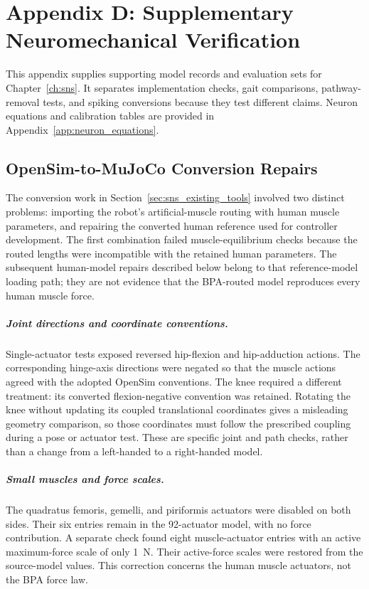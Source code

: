 \chapter{Appendix D: Supplementary Neuromechanical Verification}\label{app:simulation_verification}
\graphicspath{{figs/60-sns/}{figs/60-sns/AnimatLab_reference/}}

This appendix supplies supporting model records and evaluation sets for Chapter~\ref{ch:sns}. It separates implementation checks, gait comparisons, pathway-removal tests, and spiking conversions because they test different claims. Neuron equations and calibration tables are provided in Appendix~\ref{app:neuron_equations}.

\section{OpenSim-to-MuJoCo Conversion Repairs}\label{sec:app_conversion_repairs}

The conversion work in Section~\ref{sec:sns_existing_tools} involved two distinct problems: importing the robot's artificial-muscle routing with human muscle parameters, and repairing the converted human reference used for controller development. The first combination failed muscle-equilibrium checks because the routed lengths were incompatible with the retained human parameters. The subsequent human-model repairs described below belong to that reference-model loading path; they are not evidence that the BPA-routed model reproduces every human muscle force.

\paragraph{Joint directions and coordinate conventions.}
Single-actuator tests exposed reversed hip-flexion and hip-adduction actions. The corresponding hinge-axis directions were negated so that the muscle actions agreed with the adopted OpenSim conventions. The knee required a different treatment: its converted flexion-negative convention was retained. Rotating the knee without updating its coupled translational coordinates gives a misleading geometry comparison, so those coordinates must follow the prescribed coupling during a pose or actuator test. These are specific joint and path checks, rather than a change from a left-handed to a right-handed model.

\paragraph{Small muscles and force scales.}
The quadratus femoris, gemelli, and piriformis actuators were disabled on both sides. Their six entries remain in the 92-actuator model, with no force contribution. A separate check found eight muscle-actuator entries with an active maximum-force scale of only \qty{1}{\newton}. Their active-force scales were restored from the source-model values. This correction concerns the human muscle actuators, not the BPA force law.

